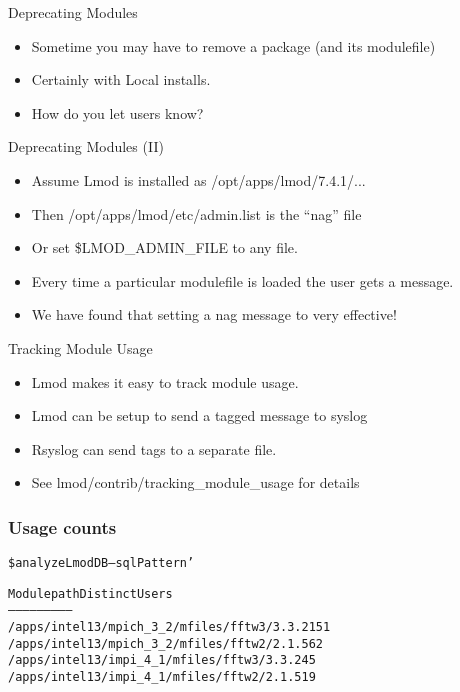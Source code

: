 \documentclass[dvipsnames,aspectratio=169]{beamer}
\begin{document}
\begin{frame}{Deprecating Modules}
  \begin{itemize}
    \item Sometime you may have to remove a package (and its
      modulefile)
    \item Certainly with Local installs.
    \item How do you let users know?
  \end{itemize}
\end{frame}

\begin{frame}{Deprecating Modules (II)}
  \begin{itemize}
    \item Assume Lmod is installed as /opt/apps/lmod/7.4.1/...
    \item Then /opt/apps/lmod/etc/admin.list is the ``nag'' file
    \item Or set \$LMOD\_ADMIN\_FILE to any file.
    \item Every time a particular modulefile is loaded the user gets a
      message.
    \item We have found that setting a nag message to very effective!
  \end{itemize}
\end{frame}

\begin{frame}{Tracking Module Usage}
  \begin{itemize}
    \item Lmod makes it easy to track module usage.
    \item Lmod can be setup to send a tagged message to syslog
    \item Rsyslog can send tags to a separate file.
    \item See lmod/contrib/tracking\_module\_usage for details
  \end{itemize}
\end{frame}

\begin{frame}[fragile]
    \frametitle{Usage counts}
  {\small
    \begin{alltt}
\$ analyzeLmodDB --sqlPattern '%fftw%' --start '2015-01-01' --end '2015-02-01'  counts

  Module path                                Distinct Users
  -----------                                --------------  
  /apps/intel13/mpich\_3\_2/mfiles/fftw3/3.3.2             151
  /apps/intel13/mpich\_3\_2/mfiles/fftw2/2.1.5              62
  /apps/intel13/impi\_4\_1/mfiles/fftw3/3.3.2               45
  /apps/intel13/impi\_4\_1/mfiles/fftw2/2.1.5               19

    \end{alltt}
}
\end{frame}
\end{document}
